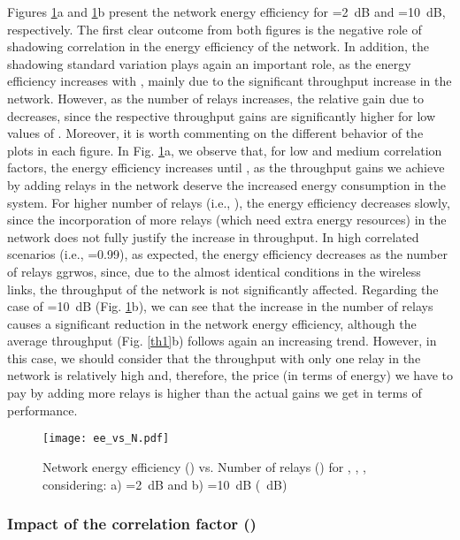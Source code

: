 \documentclass[12pt,draftcls, onecolumn]{IEEEtran}
\begin{document}
Figures \ref{ee1}a and \ref{ee1}b present the network energy efficiency for =2~dB and =10~dB, respectively. The first clear outcome from both figures is the negative role of shadowing correlation in the energy efficiency of the network. In addition, the shadowing standard variation plays again an important role, as the energy efficiency increases with , mainly due to the significant throughput increase in the network. However, as the number of relays increases, the relative gain due to  decreases, since the respective throughput gains are significantly higher for low values of . Moreover, it is worth commenting on the different behavior of the plots in each figure. In Fig. \ref{ee1}a, we observe that, for low and medium correlation factors, the energy efficiency increases until , as the throughput gains we achieve by adding relays in the network deserve the increased energy consumption in the system. For higher number of relays (i.e., ), the energy efficiency decreases slowly, since the incorporation of more relays (which need extra energy resources) in the network does not fully justify the increase in throughput. In high correlated scenarios (i.e., =0.99), as expected, the energy efficiency decreases as the number of relays ggrwos, since, due to the almost identical conditions in the wireless links, the throughput of the network is not significantly affected. Regarding the case of =10~dB (Fig. \ref{ee1}b), we can see that the increase in the number of relays causes a significant reduction in the network energy efficiency, although the average throughput (Fig. \ref{th1}b) follows again an increasing trend. However, in this case, we should consider that the throughput with only one relay in the network is relatively high and, therefore, the price (in terms of energy) we have to pay by adding more relays is higher than the actual gains we get in terms of performance.

\begin{figure}[htb]
\centering
\texttt{[image: ee\_vs\_N.pdf]}
\caption{Network energy efficiency () vs. Number of relays () for , , , considering: a) =2~dB and b) =10~dB (~dB)}\label{ee1}
\end{figure}

\subsubsection{Impact of the correlation factor ()}
\end{document}
